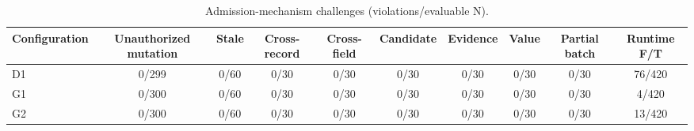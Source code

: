 \begin{table}[t]
\centering
\scriptsize
\caption{Admission-mechanism challenges (violations/evaluable N).}
\begin{tabular}{lccccccccc}
\toprule
Configuration & Unauthorized mutation & Stale & Cross-record & Cross-field & Candidate & Evidence & Value & Partial batch & Runtime F/T \\
\midrule
D1 & 0/299 & 0/60 & 0/30 & 0/30 & 0/30 & 0/30 & 0/30 & 0/30 & 76/420 \\
G1 & 0/300 & 0/60 & 0/30 & 0/30 & 0/30 & 0/30 & 0/30 & 0/30 & 4/420 \\
G2 & 0/300 & 0/60 & 0/30 & 0/30 & 0/30 & 0/30 & 0/30 & 0/30 & 13/420 \\
\bottomrule
\end{tabular}
\end{table}

